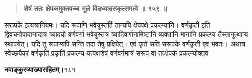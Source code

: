 \documentclass[11pt, openany]{book}
\begin{document}
\begin{sloppypar}
\begin{quote}
\hspace{1in}\textbf{शेषं ततः क्षेपकमुक्तवच्च मूले विदध्यादसकृत्समत्वे ॥ १५९ ॥}
\end{quote}

\hangindent=0.2in \hspace{0.2in}सरूपके इत्यत्रानियमः। यदि रूपाणि भवेयुस्तर्हि तान्यपि क्षेपपक्षे प्रकल्प्यानि। वर्णकृती इति द्विवचनोपादानाद्यत्र त्र्यादयो वर्णवर्गा भवेयुस्तत्र त्र्यादिवर्णानामिष्टानि व्यक्तानि मानानि प्रकल्प्य तैस्तानुत्थाप्य स्थापयेत्। यदि तु रूपाण्यपि सन्ति तदा तेषु प्रक्षिपेत्। एवं कृते सति सरूपके वर्णकृती एव भवतः। अथात्र स्वेच्छयैकां वर्णकृतिं प्रकृतिं प्रकल्प्य यत्पक्षशेषं वर्णवर्गमात्रं सरूपं वा तत्क्षेपकं प्रकल्प्योक्तव-
\end{sloppypar}
\thispagestyle{empty}
\newpage

\onehalfspacing
\hspace{2in}\textbf{नवाङ्कुरव्याख्यासहितम्।}\hspace{2in}१८१

\vspace{5mm}
\end{document}
